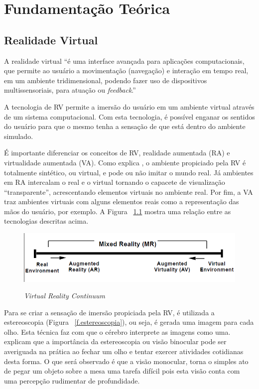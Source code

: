 \chapter{Fundamentação Teórica}
\label{c.fundamentacao}

\section{Realidade Virtual}
\label{s.rv}
A realidade virtual “é uma interface avançada para aplicações computacionais, que permite ao usuário a movimentação (navegação) e interação em tempo real, em um ambiente tridimensional, podendo fazer uso de dispositivos multissensoriais, para atuação ou \textit{feedback}.” \cite[p. ~7]{torilivro}

A tecnologia de RV permite a imersão do usuário em um ambiente virtual através de um sistema computacional. Com esta tecnologia, é possível enganar os sentidos do usuário para que o mesmo tenha a sensação de que está dentro do ambiente simulado. 

É importante diferenciar os conceitos de RV, realidade aumentada (RA) e virtualidade aumentada (VA). Como explica , o ambiente propiciado pela RV é totalmente sintético, ou virtual, e pode ou não imitar o mundo real. Já ambientes em RA intercalam o real e o virtual tornando o capacete de visualização “transparente”, acrescentando elementos virtuais no ambiente real. Por fim, a VA traz ambientes virtuais com alguns elementos reais como a representação das mãos do usuário, por exemplo. A Figura ~\ref{f.milgram} mostra uma relação entre as tecnologias descritas acima.

\begin{figure}[ht]
	\caption{\small \textit{Virtual Reality Continuum}}
	\centering
	\includegraphics[scale=0.7]{Imagens/milgram.png}
	\label{f.milgram}
\end{figure}

Para se criar a sensação de imersão propiciada pela RV, é utilizada a estereoscopia (Figura ~\ref{f.estereoscopia}), ou seja, é gerada uma imagem para cada olho. Esta técnica faz com que o cérebro interprete as imagens como uma.  explicam que a importância da estereoscopia ou visão binocular pode ser averiguada na prática ao fechar um olho e tentar exercer atividades cotidianas desta forma. O que será observado é que a visão monocular, torna o simples ato de pegar um objeto sobre a mesa uma tarefa difícil pois esta visão conta com uma percepção rudimentar de profundidade.

